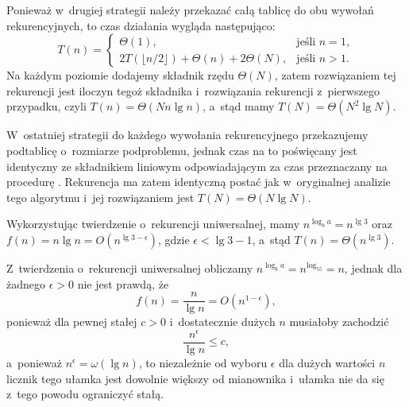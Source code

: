 Ponieważ w~drugiej strategii należy przekazać całą tablicę do obu wywołań rekurencyjnych, to czas działania wygląda następująco:
\[
	T(n) = \begin{cases}
		\Theta(1), & \text{jeśli $n=1$}, \\
		2T(\lfloor n/2\rfloor)+\Theta(n)+2\Theta(N), & \text{jeśli $n>1$}.
	\end{cases}
\]
Na każdym poziomie dodajemy składnik rzędu $\Theta(N)$, zatem rozwiązaniem tej rekurencji jest iloczyn tegoż składnika i~rozwiązania rekurencji z~pierwszego przypadku, czyli $T(n)=\Theta(Nn\lg n)$, a~stąd mamy $T(N)=\Theta(N^2\lg N)$.

W~ostatniej strategii do każdego wywołania rekurencyjnego przekazujemy podtablicę o~rozmiarze podproblemu, jednak czas na to poświęcany jest identyczny ze składnikiem liniowym odpowiadającym za czas przeznaczany na procedurę . Rekurencja ma zatem identyczną postać jak w~oryginalnej analizie tego algorytmu i~jej rozwiązaniem jest $T(N)=\Theta(N\lg N)$.


\subproblem %
Wykorzystując twierdzenie o~rekurencji uniwersalnej, mamy $n^{\log_ba}=n^{\lg3}$ oraz $f(n)=n\lg n=O(n^{\lg3-\epsilon})$, gdzie $\epsilon<\lg3-1$, a~stąd $T(n)=\Theta(n^{\lg3})$.

\subproblem %
Z~twierdzenia o~rekurencji uniwersalnej obliczamy $n^{\log_ba}=n^{\log_55}=n$, jednak dla żadnego $\epsilon>0$ nie jest prawdą, że
\[
	f(n) = \frac{n}{\lg n} = O(n^{1-\epsilon}),
\]
ponieważ dla pewnej stałej $c>0$ i~dostatecznie dużych $n$ musiałoby zachodzić
\[
	\frac{n^\epsilon}{\lg n} \le c,
\]
a~ponieważ $n^\epsilon=\omega(\lg n)$, to niezależnie od wyboru $\epsilon$ dla dużych wartości $n$ licznik tego ułamka jest dowolnie większy od mianownika i~ułamka nie da się z~tego powodu ograniczyć stałą.

